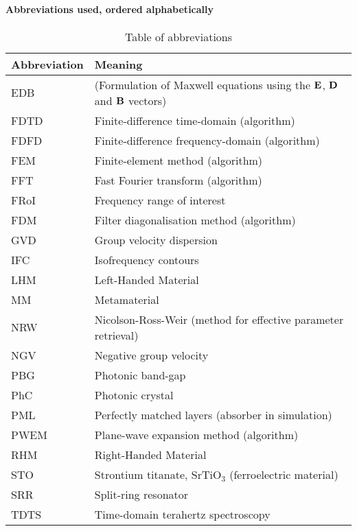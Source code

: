 \paragraph{Abbreviations used, ordered alphabetically} %
\begin{table}[ht]   \caption{Table of abbreviations}  \label{tb_shortcuts} \centering 
\begin{tabular}{ll}
 \toprule
Abbreviation & Meaning	\\
 \hline
EDB		& (Formulation of Maxwell equations using the $\mathbf{E}$, $\mathbf{D}$ and $\mathbf{B}$ vectors)\\
FDTD 		& Finite-difference time-domain (algorithm)\\
FDFD 		& Finite-difference frequency-domain (algorithm)\\
FEM 		& Finite-element method (algorithm)\\
FFT 		& Fast Fourier transform (algorithm)\\
FRoI 		& Frequency range of interest\\
FDM 		& Filter diagonalisation method (algorithm)\\
GVD 		& Group velocity dispersion \\
IFC		& Isofrequency contours\\
LHM		& Left-Handed Material\\ %
MM		& Metamaterial\\
NRW 		& Nicolson-Ross-Weir (method for effective parameter retrieval)\\
NGV 		& Negative group velocity\\
PBG		& Photonic band-gap\\
PhC 		& Photonic crystal\\
PML 		& Perfectly matched layers (absorber in simulation)\\
PWEM 		& Plane-wave expansion method (algorithm)\\
RHM 		& Right-Handed Material\\ %
STO		& Strontium titanate, SrTiO$_3$ (ferroelectric material)\\
SRR		& Split-ring resonator\\
TDTS 		& Time-domain terahertz spectroscopy\\
 \bottomrule
 \end{tabular} \end{table}

